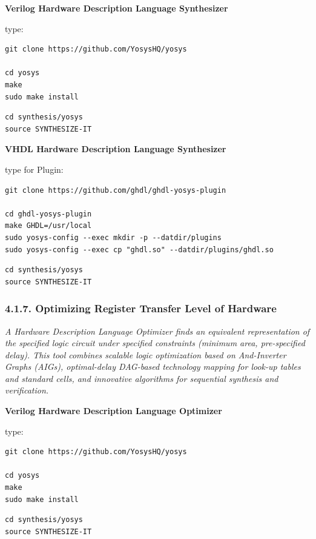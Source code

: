 \documentclass[]{article}
\begin{document}
\textbf{Verilog Hardware Description Language Synthesizer}

type:

\begin{verbatim}
git clone https://github.com/YosysHQ/yosys

cd yosys
make
sudo make install
\end{verbatim}

\begin{verbatim}
cd synthesis/yosys
source SYNTHESIZE-IT
\end{verbatim}

\textbf{VHDL Hardware Description Language Synthesizer}

type for Plugin:

\begin{verbatim}
git clone https://github.com/ghdl/ghdl-yosys-plugin

cd ghdl-yosys-plugin
make GHDL=/usr/local
sudo yosys-config --exec mkdir -p --datdir/plugins
sudo yosys-config --exec cp "ghdl.so" --datdir/plugins/ghdl.so
\end{verbatim}

\begin{verbatim}
cd synthesis/yosys
source SYNTHESIZE-IT
\end{verbatim}

\subsubsection{4.1.7. Optimizing Register Transfer Level of
Hardware}\label{optimizing-register-transfer-level-of-hardware}

\emph{A Hardware Description Language Optimizer finds an equivalent
representation of the specified logic circuit under specified
constraints (minimum area, pre-specified delay). This tool combines
scalable logic optimization based on And-Inverter Graphs (AIGs),
optimal-delay DAG-based technology mapping for look-up tables and
standard cells, and innovative algorithms for sequential synthesis and
verification.}

\textbf{Verilog Hardware Description Language Optimizer}

type:

\begin{verbatim}
git clone https://github.com/YosysHQ/yosys

cd yosys
make
sudo make install
\end{verbatim}

\begin{verbatim}
cd synthesis/yosys
source SYNTHESIZE-IT
\end{verbatim}
\end{document}
